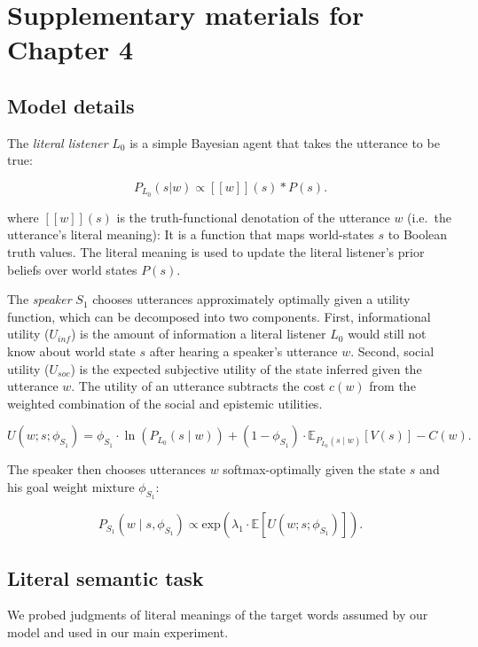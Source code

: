 \documentclass[oneside]{report}
\begin{document}
\chapter{Supplementary materials for Chapter
4}\label{supplementary-materials-for-chapter-4}

\section{Model details}\label{model-details}

The \emph{literal listener} \(L_0\) is a simple Bayesian agent that
takes the utterance to be true:

\[P_{L_0}(s | w) \propto [\![ w ]\!] (s) * P(s).\]

\noindent where \([\![ w ]\!](s)\) is the truth-functional denotation of
the utterance \(w\) (i.e.~the utterance's literal meaning): It is a
function that maps world-states \(s\) to Boolean truth values. The
literal meaning is used to update the literal listener's prior beliefs
over world states \(P(s)\).

The \emph{speaker} \(S_1\) chooses utterances approximately optimally
given a utility function, which can be decomposed into two components.
First, informational utility (\(U_{inf}\)) is the amount of information
a literal listener \(L_0\) would still not know about world state \(s\)
after hearing a speaker's utterance \(w\). Second, social utility
(\(U_{soc}\)) is the expected subjective utility of the state inferred
given the utterance \(w\). The utility of an utterance subtracts the
cost \(c(w)\) from the weighted combination of the social and epistemic
utilities.

\[U(w; s; \phi_{S_1}) = \phi_{S_1} \cdot \ln(P_{L_0}(s \mid w)) + (1 - \phi_{S_1}) \cdot \mathbb{E}_{P_{L_0}(s \mid w)}[V(s)] - C(w).\]

\noindent The speaker then chooses utterances \(w\) softmax-optimally
given the state \(s\) and his goal weight mixture \(\phi_{S_1}\):

\[P_{S_1}(w \mid s, \phi_{S_1}) \propto \mathrm{exp}(\lambda_{1} \cdot \mathbb{E}[U(w; s; \phi_{S_1})]).\]

\section{Literal semantic task}\label{literal-semantic-task}

We probed judgments of literal meanings of the target words assumed by
our model and used in our main experiment.
\end{document}
